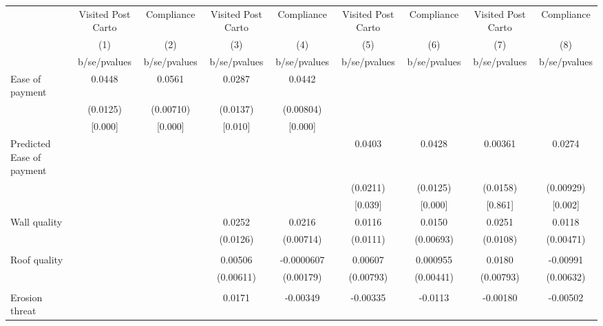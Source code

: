 {
\def\sym#1{\ifmmode^{#1}\else\(^{#1}\)\fi}
\begin{tabular}{l*{8}{c}}
\toprule
                &\multicolumn{1}{c}{Visited Post Carto}&\multicolumn{1}{c}{Compliance}&\multicolumn{1}{c}{Visited Post Carto}&\multicolumn{1}{c}{Compliance}&\multicolumn{1}{c}{Visited Post Carto}&\multicolumn{1}{c}{Compliance}&\multicolumn{1}{c}{Visited Post Carto}&\multicolumn{1}{c}{Compliance}\\
                &\multicolumn{1}{c}{(1)}&\multicolumn{1}{c}{(2)}&\multicolumn{1}{c}{(3)}&\multicolumn{1}{c}{(4)}&\multicolumn{1}{c}{(5)}&\multicolumn{1}{c}{(6)}&\multicolumn{1}{c}{(7)}&\multicolumn{1}{c}{(8)}\\
                &b/se/pvalues&b/se/pvalues&b/se/pvalues&b/se/pvalues&b/se/pvalues&b/se/pvalues&b/se/pvalues&b/se/pvalues\\
\midrule
Ease of payment &   0.0448&   0.0561&   0.0287&   0.0442&         &         &         &         \\
                & (0.0125)&(0.00710)& (0.0137)&(0.00804)&         &         &         &         \\
                &  [0.000]&  [0.000]&  [0.010]&  [0.000]&         &         &         &         \\
Predicted Ease of payment&         &         &         &         &   0.0403&   0.0428&  0.00361&   0.0274\\
                &         &         &         &         & (0.0211)& (0.0125)& (0.0158)&(0.00929)\\
                &         &         &         &         &  [0.039]&  [0.000]&  [0.861]&  [0.002]\\
Wall quality    &         &         &   0.0252&   0.0216&   0.0116&   0.0150&   0.0251&   0.0118\\
                &         &         & (0.0126)&(0.00714)& (0.0111)&(0.00693)& (0.0108)&(0.00471)\\
                &         &         &         &         &         &         &         &         \\
Roof quality    &         &         &  0.00506&-0.0000607&  0.00607& 0.000955&   0.0180& -0.00991\\
                &         &         &(0.00611)&(0.00179)&(0.00793)&(0.00441)&(0.00793)&(0.00632)\\
                &         &         &         &         &         &         &         &         \\
Erosion threat  &         &         &   0.0171& -0.00349& -0.00335&  -0.0113& -0.00180& -0.00502\\

\end{tabular}}
